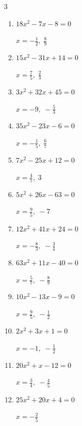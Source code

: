 \begin{multicols}{3}
\begin{enumerate}
        $\displaystyle x=-\frac{4}{3},\; \frac{7}{5}$

  \item $18x^{2}-7x-8=0$

        $\displaystyle x=-\frac{1}{2},\; \frac{8}{9}$

  \item $15x^{2}-31x+14=0$

        $\displaystyle x=\frac{7}{5},\; \frac{2}{3}$

\columnbreak %

  \item $3x^{2}+32x+45=0$

        $\displaystyle x=-9,\; -\frac{5}{3}$

  \item $35x^{2}-23x-6=0$

        $\displaystyle x=-\frac{1}{5},\; \frac{6}{7}$

  \item $7x^{2}-25x+12=0$

        $\displaystyle x=\frac{4}{7},\; 3$

  \item $5x^{2}+26x-63=0$

        $\displaystyle x=\frac{9}{5},\; -7$

  \item $12x^{2}+41x+24=0$

        $\displaystyle x=-\frac{8}{3},\; -\frac{3}{4}$

  \item $63x^{2}+11x-40=0$

        $\displaystyle x=\frac{5}{7},\; -\frac{8}{9}$

  \item $10x^{2}-13x-9=0$

        $\displaystyle x=\frac{9}{5},\; -\frac{1}{2}$

  \item $2x^{2}+3x+1=0$

        $\displaystyle x=-1,\; -\frac{1}{2}$

  \item $20x^{2}+x-12=0$

        $\displaystyle x=\frac{3}{4},\; -\frac{4}{5}$

  \item $25x^{2}+20x+4=0$

        $\displaystyle x=-\frac{2}{5}$

\columnbreak %

\resetques


\end{enumerate}
\end{multicols}
